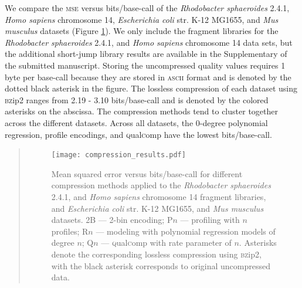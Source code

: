 We compare the \textsc{mse} versus bits/base-call of the
\textit{Rhodobacter sphaeroides} 2.4.1, \textit{Homo sapiens}
chromosome 14, \textit{Escherichia coli} str. K-12 MG1655, and
\textit{Mus musculus} datasets (Figure \ref{fig:mse_vs_bpbp}). We
only include the fragment libraries for the \textit{Rhodobacter
  sphaeroides} 2.4.1, and \textit{Homo sapiens} chromosome 14 data
sets, but the additional short-jump library results are available in
the Supplementary of the submitted manuscript. Storing the uncompressed quality
values requires 1 byte per base-call because they are stored in
\textsc{ascii} format and is denoted by the dotted black asterisk in
the figure. The lossless compression of each dataset using \textsc{bz}ip2
ranges from 2.19 - 3.10 bits/base-call and is denoted by the colored
asterisks on the abscissa. The compression methods tend to cluster
together across the different datasets. Across all datasets, the
0-degree polynomial regression, profile encodings, and \textsc{q}ual\textsc{c}omp have
the lowest bits/base-call.


\begin{landscape}
\renewcommand{\baselinestretch}{1}
\small\normalsize
\begin{quote}
\begin{figure}[!tpb]%
\begin{center}
\texttt{[image: compression\_results.pdf]}
\end{center}
\renewcommand{\baselinestretch}{1}
\small\normalsize
\caption[Mean squared error versus bits/base-call for different
  compression methods applied to the \textit{Rhodobacter sphaeroides}
  2.4.1, and \textit{Homo sapiens} chromosome 14 fragment libraries,
  and \textit{Escherichia coli} str. K-12 MG1655, and \textit{Mus
    musculus} datasets]{Mean squared error versus bits/base-call for different
  compression methods applied to the \textit{Rhodobacter sphaeroides}
  2.4.1, and \textit{Homo sapiens} chromosome 14 fragment libraries,
  and \textit{Escherichia coli} str. K-12 MG1655, and \textit{Mus
    musculus} datasets. 2B --- 2-bin encoding; P$n$ --- profiling
  with $n$ profiles; R$n$ --- modeling with polynomial regression
  models of degree $n$; Q$n$ --- \textsc{q}ual\textsc{c}omp with rate parameter of
  $n$. Asterisks denote the corresponding lossless compression using
  \textsc{bz}ip2, with the black asterisk corresponds to original uncompressed
  data.}
  \label{fig:mse_vs_bpbp}
\end{figure}
\end{quote}
\renewcommand{\baselinestretch}{2}
\small\normalsize
\end{landscape}


